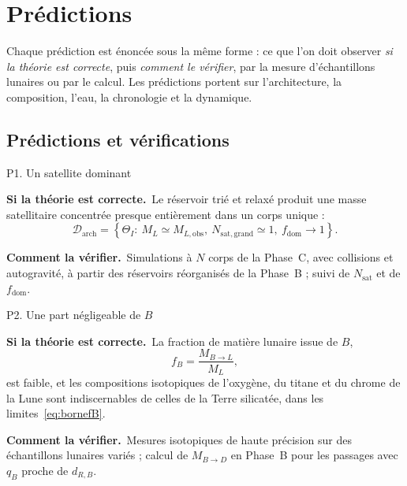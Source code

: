 \documentclass[11pt,a4paper,openany]{report}
\newcommand{\sila}{\par\noindent\textbf{Si la théorie est correcte.}\ }
\newcommand{\verif}{\par\smallskip\noindent\textbf{Comment la vérifier.}\ }
\begin{document}
\part{Prédictions}
\label{part:predictions}

\noindent
Chaque prédiction est énoncée sous la même forme : ce que l'on doit observer \emph{si la théorie
est correcte}, puis \emph{comment le vérifier}, par la mesure d'échantillons lunaires ou par le
calcul. Les prédictions portent sur l'architecture, la composition, l'eau, la chronologie et la
dynamique.

\chapter{Prédictions et vérifications}
\label{ch:predictions}
\label{sec:signatures}

\begin{prediction}{P1. Un satellite dominant}
\sila Le réservoir trié et relaxé produit une masse satellitaire concentrée presque entièrement
dans un corps unique :
\begin{equation}
\mathcal{D}_{\mathrm{arch}}=\left\{\Theta_I:\ M_L\simeq M_{L,\mathrm{obs}},\
N_{\mathrm{sat,grand}}\simeq1,\ f_{\mathrm{dom}}\to1\right\}.
\label{eq:Darch}
\end{equation}
\verif Simulations à $N$ corps de la Phase~C, avec collisions et autogravité, à partir des
réservoirs réorganisés de la Phase~B ; suivi de $N_{\mathrm{sat}}$ et de $f_{\mathrm{dom}}$.
\end{prediction}

\begin{prediction}{P2. Une part négligeable de $B$}
\sila La fraction de matière lunaire issue de $B$,
\begin{equation}
f_B=\frac{M_{B\to L}}{M_L},
\label{eq:fB}
\end{equation}
est faible, et les compositions isotopiques de l'oxygène, du titane et du chrome de la Lune sont
indiscernables de celles de la Terre silicatée, dans les limites~\eqref{eq:bornefB}.
\verif Mesures isotopiques de haute précision sur des échantillons lunaires variés ; calcul de
$M_{B\to D}$ en Phase~B pour les passages avec $q_B$ proche de $d_{R,B}$.
\end{prediction}
\end{document}
